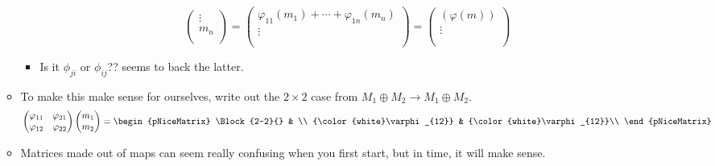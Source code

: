 \documentclass[../notes.tex]{subfiles}
\begin{document}
\begin{itemize}
\begin{itemize}
\begin{equation*}
\begin{pmatrix}
                \vdots\\
                m_n\\
            \end{pmatrix}
            =
            \begin{pmatrix}
                \varphi_{11}(m_1)+\cdots+\varphi_{1n}(m_n)\\
                \vdots\\
                \\
            \end{pmatrix}
            =
            \begin{pmatrix}
                (\varphi(m))\\
                \vdots\\
                \\
            \end{pmatrix}
        \end{equation*}
        \begin{itemize}
            \item Is it $\phi_{ji}$ or $\phi_{ij}$?? \textcite[642]{bib:Lang} seems to back the latter.
        \end{itemize}
        \item To make this make sense for ourselves, write out the $2\times 2$ case from $M_1\oplus M_2\to M_1\oplus M_2$.
        \begin{equation*}
            \begin{pmatrix}
                \varphi_{11} & \varphi_{21}\\
                \varphi_{12} & \varphi_{22}\\
            \end{pmatrix}
            \begin{pmatrix}
                m_1\\
                m_2\\
            \end{pmatrix}
            =
            \begin{pNiceMatrix}
                \Block{2-2}{} & \\
                {\color{white}\varphi_{12}} & {\color{white}\varphi_{12}}\\
            \end{pNiceMatrix}
        \end{equation*}
        \item Matrices made out of maps can seem really confusing when you first start, but in time, it will make sense.

\end{itemize}
\end{itemize}
\end{document}
